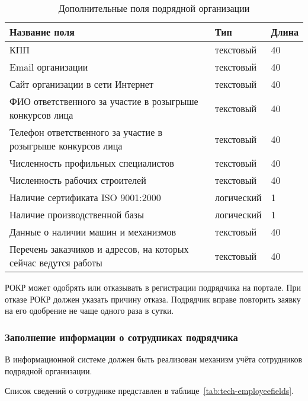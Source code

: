 \begin{footnotesize}
\begin{longtable}[h]{|p{}|p{}|p{}|}
	\caption{\label{tab:tech-orgaddfields}Дополнительные поля подрядной организации} \\
	\hline
		\textbf{Название поля} & \textbf{Тип} & \textbf{Длина} \\
	\hline \endhead
		КПП & текстовый & 40 \\
	\hline
		Email организации & текстовый & 40 \\
	\hline
		Сайт организации в сети Интернет & текстовый & 40 \\
	\hline
		ФИО ответственного за участие в розыгрыше конкурсов лица & текстовый & 40 \\
	\hline
		Телефон ответственного за участие в розыгрыше конкурсов лица & текстовый & 40 \\
	\hline
		Численность профильных специалистов & текстовый & 40 \\
	\hline
		Численность рабочих строителей & текстовый & 40 \\
	\hline
		Наличие сертификата ISO 9001:2000 & логический & 1 \\
	\hline
		Наличие производственной базы & логический & 1 \\
	\hline
		Данные о наличии машин и механизмов & текстовый & 40 \\
	\hline
		Перечень заказчиков и адресов, на которых сейчас ведутся работы & текстовый & 40 \\
	\hline
\end{longtable}
\end{footnotesize}

РОКР может одобрять или отказывать в регистрации подрядчика на портале.
При отказе РОКР должен указать причину отказа.
Подрядчик вправе повторить заявку на его одобрение не чаще одного раза в сутки.

\subsubsection{Заполнение информации о сотрудниках подрядчика}

В информационной системе должен быть реализован механизм учёта сотрудников подрядной организации.

Список сведений о сотруднике представлен в таблице~\ref{tab:tech-employeefields}.

